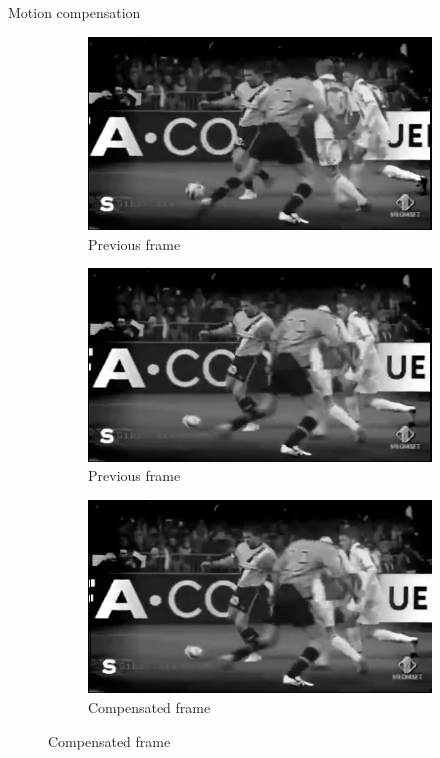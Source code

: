 \documentclass[aspectratio=1610,xcolor=dvipsnames]{beamer}
\begin{document}
\begin{frame}{Motion compensation}
    \begin{figure}[htbp]
        \begin{subfigure}[b]{0.3\textwidth}
            \centering
            \includegraphics[width=.9\textwidth]{images/dp-previous.png}
            \caption{Previous frame}
            \label{fig:dp-prev-frame}
        \end{subfigure}
        \hfill
        \begin{subfigure}[b]{0.3\textwidth}
            \includegraphics[width=.9\textwidth]{images/dp-current.png}
            \caption{Previous frame}
            \label{fig:dp-curr-frame}
        \end{subfigure}
        \hfill
        \begin{subfigure}[b]{0.3\textwidth}
            \includegraphics[width=.9\textwidth]{images/dp-compensated.png}
            \caption{Compensated frame}
            \label{fig:dp-compensated}
        \end{subfigure}
        

\end{figure}
\end{frame}
\end{document}
